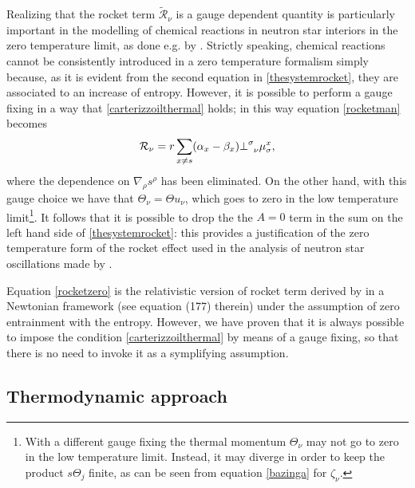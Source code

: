 \documentclass[usenatbib]{mnras}
\begin{document}
Realizing that the rocket term $\tilde{\mathcal{R}}_\nu$ is a gauge dependent quantity is particularly important in the modelling of chemical reactions in neutron star interiors in the zero temperature limit, as done e.g. by \cite{ColucciRocket2013}. Strictly speaking, chemical reactions cannot be consistently introduced in a zero temperature formalism simply because, as it is evident from the second equation in \eqref{thesystemrocket}, they are associated to an increase of entropy. However, it is possible to perform a gauge fixing  in a way that  \eqref{carterizzoilthermal} holds; in this way  equation \eqref{rocketman} becomes
%
\begin{equation}
\mathcal{R}_{\nu} = r \sum_{x \neq s} (\alpha_x - \beta_x) {\perp}\indices{^\sigma _\nu}\mu^x_\sigma ,
\label{rocketzero}
\end{equation}
%
where the dependence on $\nabla_\rho s^\rho$ has been eliminated. On the other hand, with this gauge choice we have that $\Theta_\nu = \Theta u_\nu$, which goes to zero in the low temperature limit\footnote{
With a different gauge fixing the thermal momentum $\Theta_\nu$ may not go to zero in the low temperature limit. Instead, it may diverge in order to keep the product $s\Theta_j$ finite, as can be  seen from equation \eqref{bazinga} for $\zeta_\nu$.
}. 
It follows that it is possible to drop the the $A=0$ term in the sum on the left hand side of  \eqref{thesystemrocket}: this provides a justification of the zero temperature form of the rocket effect used  in the analysis of neutron star oscillations made  by \cite{ColucciRocket2013}. 

Equation \eqref{rocketzero} is the relativistic version of rocket term derived by \cite{prix2004} in a Newtonian framework (see equation (177) therein)  under the assumption of zero entrainment with the entropy. 
%
However, we have proven that it is always possible to impose the condition \eqref{carterizzoilthermal} by means of a gauge fixing, so that there is no need to invoke it as a symplifying assumption.


\subsection{Thermodynamic approach   }
\label{Thermodynamic approach}
\end{document}
